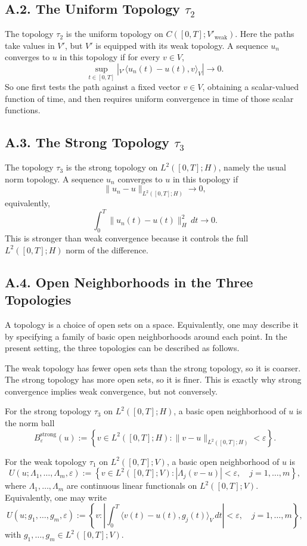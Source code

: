 \documentclass[11pt]{article}
\theoremstyle{definition}
\theoremstyle{remark}
\newcommand{\dual}[2]{{}_{V'}\langle #1, #2 \rangle_{V}}
\begin{document}
\subsection*{A.2. The Uniform Topology $\tau_2$}
The topology $\tau_2$ is the uniform topology on $C([0,T];V'_{\mathrm{weak}})$. Here the paths take values in $V'$, but $V'$ is equipped with its weak topology. A sequence $u_n$ converges to $u$ in this topology if for every $v\in V$,
\[
  \sup_{t\in[0,T]}
  \left|
    \dual{u_n(t)-u(t)}{v}
  \right|
  \to 0.
\]
So one first tests the path against a fixed vector $v\in V$, obtaining a scalar-valued function of time, and then requires uniform convergence in time of those scalar functions.

\subsection*{A.3. The Strong Topology $\tau_3$}
The topology $\tau_3$ is the strong topology on $L^2([0,T];H)$, namely the usual norm topology. A sequence $u_n$ converges to $u$ in this topology if
\[
  \|u_n-u\|_{L^2([0,T];H)}\to 0,
\]
equivalently,
\[
  \int_0^T \|u_n(t)-u(t)\|_H^2\,dt \to 0.
\]
This is stronger than weak convergence because it controls the full $L^2([0,T];H)$ norm of the difference.

\subsection*{A.4. Open Neighborhoods in the Three Topologies}
A topology is a choice of open sets on a space. Equivalently, one may describe it by specifying a family of basic open neighborhoods around each point. In the present setting, the three topologies can be described as follows.

The weak topology has fewer open sets than the strong topology, so it is coarser. The strong topology has more open sets, so it is finer. This is exactly why strong convergence implies weak convergence, but not conversely.

For the strong topology $\tau_3$ on $L^2([0,T];H)$, a basic open neighborhood of $u$ is the norm ball
\[
  B^{\mathrm{strong}}_\varepsilon(u)
  :=
  \left\{
    v\in L^2([0,T];H):
    \|v-u\|_{L^2([0,T];H)}<\varepsilon
  \right\}.
\]

For the weak topology $\tau_1$ on $L^2([0,T];V)$, a basic open neighborhood of $u$ is
\[
  U(u;\Lambda_1,\dots,\Lambda_m,\varepsilon)
  :=
  \left\{
    v\in L^2([0,T];V):
    |\Lambda_j(v-u)|<\varepsilon,\quad j=1,\dots,m
  \right\},
\]
where $\Lambda_1,\dots,\Lambda_m$ are continuous linear functionals on $L^2([0,T];V)$. Equivalently, one may write
\[
  U(u;g_1,\dots,g_m,\varepsilon)
  :=
  \left\{
    v:
    \left|
      \int_0^T \langle v(t)-u(t),g_j(t)\rangle_V\,dt
    \right|<\varepsilon,\quad j=1,\dots,m
  \right\},
\]
with $g_1,\dots,g_m\in L^2([0,T];V)$.
\end{document}
